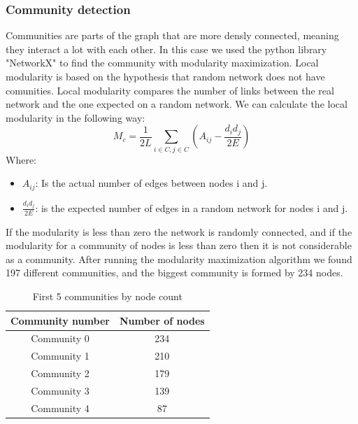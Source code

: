 \documentclass[12pt,journal,compsoc]{IEEEtran}
\begin{document}
\subsubsection{Community detection}
Communities are parts of the graph that are more densly connected, meaning they interact a lot with each other. In this case we used the python library "NetworkX\cite{NetworkX}" to find the community with modularity maximization. Local modularity is based on the hypothesis that random network does not have comunities. Local modularity\cite{Modularity} compares the number of links between the real network and the one expected on a random network. We can calculate the local modularity in the following way:
\[M_c = \frac{1}{2L}\sum_{i \in C, j\in C }(A_{ij} - \frac{d_id_j}{2E})\] 
Where:
\begin{itemize}[]
    \item $A_{ij}$: Is the actual number of edges between nodes i and j.
    \item $\frac{d_id_j}{2E}$: is the expected number of edges in a random network for nodes i and j.
\end{itemize}
If the modularity is less than zero the network is randomly connected, and if the modularity for a community of nodes is less than zero then it is not considerable as a community.
After running the modularity maximization algorithm we found 197 different communities, and the biggest community is formed by 234 nodes.
\begin{table}[ht]
	\centering
	\begin{tabular}{c c }
		Community number & Number of nodes  \\
		\hline
		Community 0& 234  \\
		Community 1& 210  \\
		Community 2& 179  \\
		Community 3& 139  \\
		Community 4& 87  \\
	\end{tabular}
	\caption{First 5 communities by node count}
	\end{table}
\end{document}
